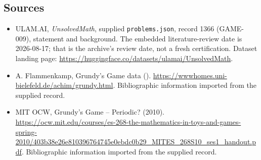 \documentclass[11pt,a4paper]{article}
\begin{document}
\subsection{Sources}

{\small

\begin{itemize}

\item[\hypertarget{source:1366:1}{S1}] ULAM.AI, \emph{UnsolvedMath}, supplied \texttt{problems.json}, record 1366 (GAME-009), statement and background. The embedded literature-review date is 2026-08-17; that is the archive’s review date, not a fresh certification. Dataset landing page: \url{https://huggingface.co/datasets/ulamai/UnsolvedMath}.

\item[\hypertarget{source:1366:2}{S2}] A. Flammenkamp, Grundy's Game data (). \url{https://wwwhomes.uni-bielefeld.de/achim/grundy.html}. Bibliographic information imported from the supplied record.

\item[\hypertarget{source:1366:3}{S3}] MIT OCW, Grundy's Game -- Periodic? (2010). \url{https://ocw.mit.edu/courses/es-268-the-mathematics-in-toys-and-games-spring-2010/403b38e26e810396764745e0ebdc0b29_MITES_268S10_ses1_handout.pdf}. Bibliographic information imported from the supplied record.

\end{itemize}

}

\label{end:1366}
\end{document}
